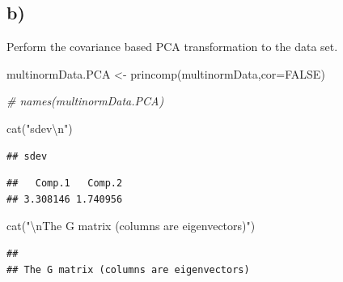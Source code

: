 \documentclass[
]{article}
\newenvironment{Shaded}{\begin{snugshade}}{\end{snugshade}}
\newcommand{\AttributeTok}[1]{\textcolor[rgb]{0.77,0.63,0.00}{#1}}
\newcommand{\CommentTok}[1]{\textcolor[rgb]{0.56,0.35,0.01}{\textit{#1}}}
\newcommand{\ConstantTok}[1]{\textcolor[rgb]{0.00,0.00,0.00}{#1}}
\newcommand{\FunctionTok}[1]{\textcolor[rgb]{0.00,0.00,0.00}{#1}}
\newcommand{\NormalTok}[1]{#1}
\newcommand{\OtherTok}[1]{\textcolor[rgb]{0.56,0.35,0.01}{#1}}
\newcommand{\SpecialCharTok}[1]{\textcolor[rgb]{0.00,0.00,0.00}{#1}}
\newcommand{\StringTok}[1]{\textcolor[rgb]{0.31,0.60,0.02}{#1}}
\begin{document}
\hypertarget{b}{%
\subsection{b)}\label{b}}

Perform the covariance based PCA transformation to the data set.

\begin{Shaded}
\begin{Highlighting}[]
\NormalTok{multinormData.PCA }\OtherTok{\textless{}{-}} \FunctionTok{princomp}\NormalTok{(multinormData,}\AttributeTok{cor=}\ConstantTok{FALSE}\NormalTok{)}

\CommentTok{\# names(multinormData.PCA)}

\FunctionTok{cat}\NormalTok{(}\StringTok{"sdev}\SpecialCharTok{\textbackslash{}n}\StringTok{"}\NormalTok{)}
\end{Highlighting}
\end{Shaded}

\begin{verbatim}
## sdev
\end{verbatim}

\begin{Shaded}
\end{Shaded}

\begin{verbatim}
##   Comp.1   Comp.2 
## 3.308146 1.740956
\end{verbatim}

\begin{Shaded}
\begin{Highlighting}[]
\FunctionTok{cat}\NormalTok{(}\StringTok{"}\SpecialCharTok{\textbackslash{}n}\StringTok{The G matrix (columns are eigenvectors)"}\NormalTok{)}
\end{Highlighting}
\end{Shaded}

\begin{verbatim}
## 
## The G matrix (columns are eigenvectors)
\end{verbatim}

\begin{Shaded}
\end{Shaded}
\end{document}
